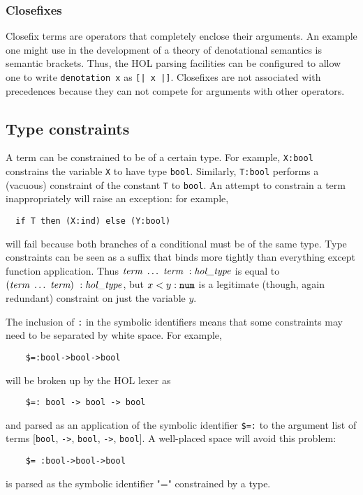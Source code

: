 {\subsubsection{Closefixes}

Closefix terms are operators that completely enclose their arguments.
An example one might use in the development of a theory of
denotational semantics is semantic brackets.  Thus, the HOL parsing
facilities can be configured to allow one to write \texttt{denotation x}
as \texttt{[| x |]}.  Closefixes are not associated with precedences
because they can not compete for arguments with other operators.

\subsection{Type constraints}

A term can be constrained to be of a certain type.  For example,
\verb+X:bool+ constrains the variable \verb+X+ to have type
\verb+bool+. Similarly, \verb+T:bool+ performs a (vacuous) constraint
of the constant \verb+T+ to \verb+bool+. An attempt to constrain a
term inappropriately will raise an exception: for example,
\begin{verbatim}
  if T then (X:ind) else (Y:bool)
\end{verbatim}
will fail because both branches of a conditional must be of the same
type.  Type constraints can be seen as a suffix that binds more
tightly than everything except function application.  Thus $\mbox{\it term}\
\ldots\ \mbox{\it term} \ : \mbox{\it hol\_type}$ is equal to $(\mbox{\it term}\ \ldots\ \mbox{\it term})\ :
\mbox{\it hol\_type}$, but $x < y:\mbox{\tt num}$ is a legitimate (though, again
redundant) constraint on just the variable $y$.

The inclusion of \verb+:+ in the symbolic identifiers means that some
constraints may need to be separated by white space. For example,
\begin{verbatim}
    $=:bool->bool->bool
\end{verbatim}
will be broken up by the HOL lexer as
\begin{verbatim}
    $=: bool -> bool -> bool
\end{verbatim}
and parsed as an application of the symbolic identifier \verb+$=:+ to
the argument list of terms [\verb+bool+, \verb+->+, \verb+bool+,
\verb+->+, \verb+bool+]. A well-placed space will avoid this problem:
\begin{verbatim}
    $= :bool->bool->bool
\end{verbatim}
is parsed as the symbolic identifier "=" constrained by a type.

}
